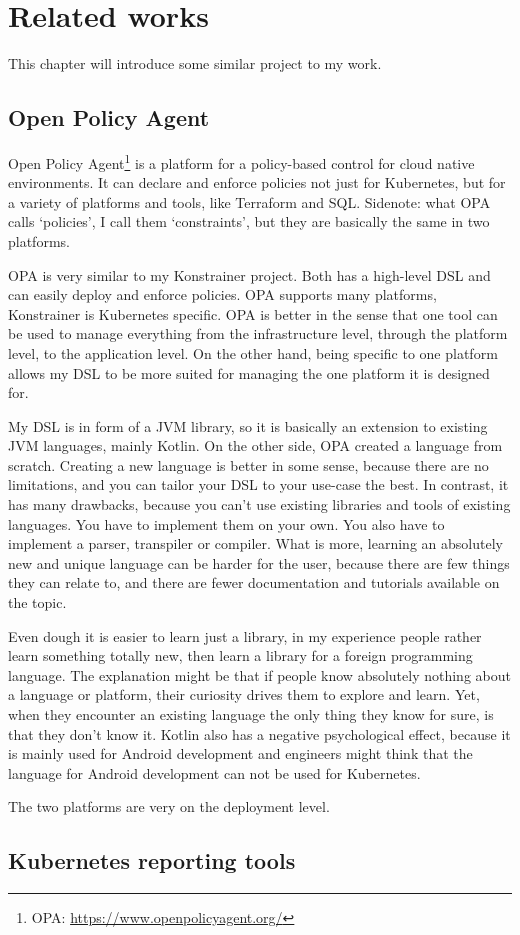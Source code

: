 \setlength{\parindent}{0pt}
\setlength{\parskip}{0.6em}

\chapter{Related works}
\label{chap:relatedWorks}

This chapter will introduce some similar project to my work.

\section{Open Policy Agent}

Open Policy Agent\footnote{OPA: \url{https://www.openpolicyagent.org/}} is a platform for a policy-based control for cloud native environments. It can declare and enforce policies not just for Kubernetes, but for a variety of platforms and tools, like Terraform and SQL. Sidenote: what OPA calls `policies', I call them `constraints', but they are basically the same in two platforms.

OPA is very similar to my Konstrainer project. Both has a high-level DSL and can easily deploy and enforce policies. OPA supports many platforms, Konstrainer is Kubernetes specific. OPA is better in the sense that  one tool can be used to manage everything from the infrastructure level, through the platform level, to the application level. On the other hand, being specific to one platform allows my DSL to be more suited for managing the one platform it is designed for.

My DSL is in form of a JVM library, so it is basically an extension to existing JVM languages, mainly Kotlin. On the other side, OPA created a language from scratch. Creating a new language is better in some sense, because there are no limitations, and you can tailor your DSL to your use-case the best. In contrast, it has many drawbacks, because you can't use existing libraries and tools of existing languages. You have to implement them on your own. You also have to implement a parser, transpiler or compiler. What is more, learning an absolutely new and unique language can be harder for the user, because there are few things they can relate to, and there are fewer documentation and tutorials available on the topic.

Even dough it is easier to learn just a library, in my experience people rather learn something totally new, then learn a library for a foreign programming language. The explanation might be that if people know absolutely nothing about a language or platform, their curiosity drives them to explore and learn. Yet, when they encounter an existing language the only thing they know for sure, is that they don't know it. Kotlin also has a negative psychological effect, because it is mainly used for Android development and engineers might think that the language for Android development can not be used for Kubernetes.

The two platforms are very on the deployment level.

\section{Kubernetes reporting tools}


